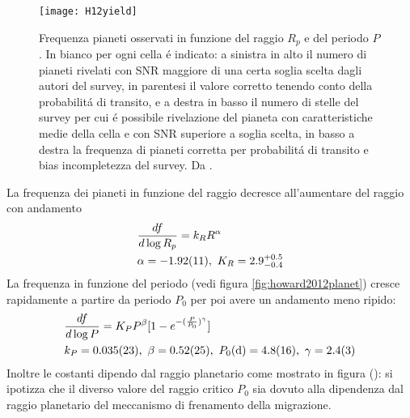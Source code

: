 \begin{figure}[!ht]
	\centering
	\texttt{[image: H12yield]}
	\caption{Frequenza pianeti osservati in funzione del raggio $R_p$ e del periodo $P$. In bianco per ogni cella \'e indicato: a sinistra in alto il numero di pianeti rivelati con SNR maggiore di una certa soglia scelta dagli autori del survey, in parentesi il valore corretto tenendo conto della probabilit\'a di transito, e a destra in basso il numero di stelle del survey per cui \'e possibile rivelazione del pianeta con caratteristiche medie della cella e con SNR superiore a soglia scelta, in basso a destra la frequenza di pianeti corretta per probabilit\'a di transito e bias incompletezza del survey. Da \cite{howard2012planet}.}\label{fig:H12yield}
\end{figure}

La frequenza dei pianeti in funzione del raggio decresce all'aumentare del raggio con andamento
\begin{equation}
\begin{aligned}
&\TDy{\log{R_p}}{f}=k_RR\expy{\alpha}\\
&\alpha=\num{-1.92+-0.11},\ K_R=2.9_{-0.4}^{+0.5}
\end{aligned}
\end{equation}
La frequenza in funzione del periodo (vedi figura \ref{fig:howard2012planet}) cresce rapidamente a partire da periodo $P_0$ per poi avere un andamento meno ripido:
\begin{equation}
\begin{aligned}
&\TDy{\log{P}}{f}=K_PP\expy{\beta}[1-\exp{-(\frac{P}{P_0})\expy{\gamma}}]\\
&k_P=\num{0.035+-0.023},\ \beta=\num{0.52+-0.25},\ P_0(\si{\day})=\num{4.8+-1.6},\ \gamma=\num{2.4+-0.3}
\end{aligned}
\end{equation}
Inoltre le costanti dipendo dal raggio planetario come mostrato in figura (): si ipotizza che il diverso valore del raggio critico $P_0$ sia dovuto alla dipendenza dal raggio planetario del meccanismo di frenamento della migrazione.

